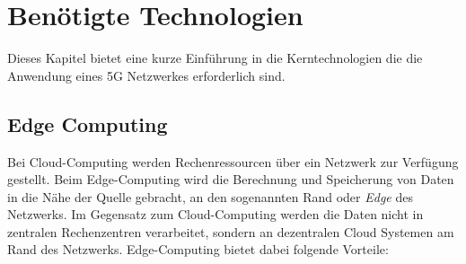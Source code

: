 \documentclass[runningheads]{llncs}
\numberwithin{figure}{section}
\begin{document}
\newpage
\section{Benötigte Technologien}
\label{sec:Benötigte Technologien}
Dieses Kapitel bietet eine kurze Einführung in die Kerntechnologien die die Anwendung eines 5G Netzwerkes erforderlich sind.
\subsection{Edge Computing}
\label{sub:Edge Computing}
Bei Cloud-Computing werden Rechenressourcen über ein Netzwerk zur Verfügung gestellt.
Beim Edge-Computing wird die Berechnung und Speicherung von Daten in die Nähe der Quelle gebracht,
an den sogenannten Rand oder \textit{Edge} des Netzwerks. Im Gegensatz zum Cloud-Computing werden die Daten
nicht in zentralen Rechenzentren verarbeitet, sondern an dezentralen Cloud Systemen am Rand des Netzwerks. 
Edge-Computing bietet dabei folgende Vorteile: \cite{labrieTopBenefitsEdge}
\end{document}
